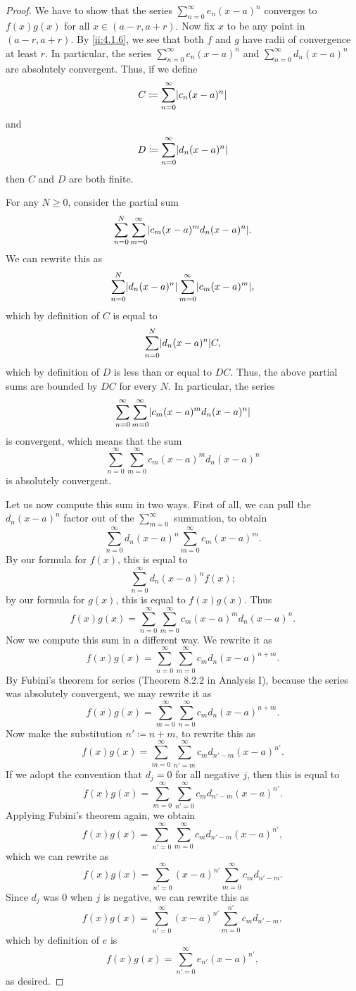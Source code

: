 \begin{proof}
  We have to show that the series \(\sum_{n = 0}^\infty e_n (x - a)^n\) converges to \(f(x) g(x)\) for all \(x \in (a - r, a + r)\).
  Now fix \(x\) to be any point in \((a - r, a + r)\).
  By \cref{ii:4.1.6}, we see that both \(f\) and \(g\) have radii of convergence at least \(r\).
  In particular, the series \(\sum_{n = 0}^\infty c_n (x - a)^n\) and \(\sum_{n = 0}^\infty d_n (x - a)^n\) are absolutely convergent.
  Thus, if we define
  \[
    C \coloneqq \sum_{n = 0}^\infty \abs{c_n (x - a)^n}
  \]
  and
  \[
    D \coloneqq \sum_{n = 0}^\infty \abs{d_n (x - a)^n}
  \]
  then \(C\) and \(D\) are both finite.

  For any \(N \geq 0\), consider the partial sum
  \[
    \sum_{n = 0}^N \sum_{m = 0}^\infty \abs{c_m (x - a)^m d_n (x - a)^n}.
  \]
  We can rewrite this as
  \[
    \sum_{n = 0}^N \abs{d_n (x - a)^n} \sum_{m = 0}^\infty \abs{c_m (x - a)^m},
  \]
  which by definition of \(C\) is equal to
  \[
    \sum_{n = 0}^N \abs{d_n (x - a)^n} C,
  \]
  which by definition of \(D\) is less than or equal to \(DC\).
  Thus, the above partial sums are bounded by \(DC\) for every \(N\).
  In particular, the series
  \[
    \sum_{n = 0}^\infty \sum_{m = 0}^\infty \abs{c_m (x - a)^m d_n (x - a)^n}
  \]
  is convergent, which means that the sum
  \[
    \sum_{n = 0}^\infty \sum_{m = 0}^\infty c_m (x - a)^m d_n (x - a)^n
  \]
  is absolutely convergent.

  Let us now compute this sum in two ways.
  First of all, we can pull the \(d_n (x - a)^n\) factor out of the \(\sum_{m = 0}^\infty\) summation, to obtain
  \[
    \sum_{n = 0}^\infty d_n (x - a)^n \sum_{m = 0}^\infty c_m (x - a)^m.
  \]
  By our formula for \(f(x)\), this is equal to
  \[
    \sum_{n = 0}^\infty d_n (x - a)^n f(x);
  \]
  by our formula for \(g(x)\), this is equal to \(f(x) g(x)\).
  Thus
  \[
    f(x) g(x) = \sum_{n = 0}^\infty \sum_{m = 0}^\infty c_m (x - a)^m d_n (x - a)^n.
  \]
  Now we compute this sum in a different way.
  We rewrite it as
  \[
    f(x) g(x) = \sum_{n = 0}^\infty \sum_{m = 0}^\infty c_m d_n (x - a)^{n + m}.
  \]
  By Fubini's theorem for series (Theorem 8.2.2 in Analysis I), because the series was absolutely convergent, we may rewrite it as
  \[
    f(x) g(x) = \sum_{m = 0}^\infty \sum_{n = 0}^\infty c_m d_n (x - a)^{n + m}.
  \]
  Now make the substitution \(n' \coloneqq n + m\), to rewrite this as
  \[
    f(x) g(x) = \sum_{m = 0}^\infty \sum_{n' = m}^\infty c_m d_{n' - m} (x - a)^{n'}.
  \]
  If we adopt the convention that \(d_j = 0\) for all negative \(j\), then this is equal to
  \[
    f(x) g(x) = \sum_{m = 0}^\infty \sum_{n' = 0}^\infty c_m d_{n' - m} (x - a)^{n'}.
  \]
  Applying Fubini's theorem again, we obtain
  \[
    f(x) g(x) = \sum_{n' = 0}^\infty \sum_{m = 0}^\infty c_m d_{n' - m} (x - a)^{n'},
  \]
  which we can rewrite as
  \[
    f(x) g(x) = \sum_{n' = 0}^\infty (x - a)^{n'} \sum_{m = 0}^\infty c_m d_{n' - m}.
  \]
  Since \(d_j\) was \(0\) when \(j\) is negative, we can rewrite this as
  \[
    f(x) g(x) = \sum_{n' = 0}^\infty (x - a)^{n'} \sum_{m = 0}^{n'} c_m d_{n' - m},
  \]
  which by definition of \(e\) is
  \[
    f(x) g(x) = \sum_{n' = 0}^\infty e_{n'} (x - a)^{n'},
  \]
  as desired.
\end{proof}

